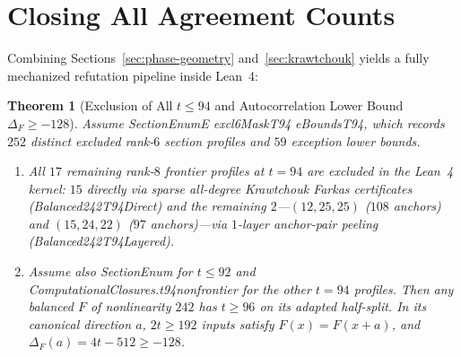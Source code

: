 \documentclass[11pt]{article}
\newtheorem{theorem}{Theorem}[section]
\theoremstyle{definition}
\newcommand{\code}[1]{{\ttfamily\small\renewcommand{\_}{\textunderscore\allowbreak}#1}}
\begin{document}
\section{Closing All Agreement Counts}
\label{sec:exclusions}

Combining Sections~\ref{sec:phase-geometry} and~\ref{sec:krawtchouk} yields a fully mechanized refutation pipeline inside Lean~4:

\begin{theorem}[Exclusion of All $t \le 94$ and Autocorrelation Lower Bound $\Delta_F \ge -128$]
\label{thm:t94}
Assume \code{SectionEnumE excl6MaskT94 eBoundsT94}, which records $252$ distinct excluded rank-$6$ section profiles and $59$ exception lower bounds.
\begin{enumerate}[nosep]
  \item All $17$ remaining rank-$8$ frontier profiles at $t = 94$ are excluded in the Lean~4 kernel: $15$ directly via sparse all-degree Krawtchouk Farkas certificates (\code{Balanced242T94Direct}) and the remaining $2$---$(12, 25, 25)$ ($108$ anchors) and $(15, 24, 22)$ ($97$ anchors)---via $1$-layer anchor-pair peeling (\code{Balanced242T94Layered}).
  \item Assume also \code{SectionEnum} for $t\le92$ and \code{ComputationalClosures.t94\_nonfrontier} for the other $t=94$ profiles. Then any balanced $F$ of nonlinearity $242$ has $t\ge96$ on its adapted half-split. In its canonical direction $a$, $2t\ge192$ inputs satisfy $F(x)=F(x+a)$, and $\Delta_F(a)=4t-512\ge-128$.
\end{enumerate}
\end{theorem}
\end{document}
